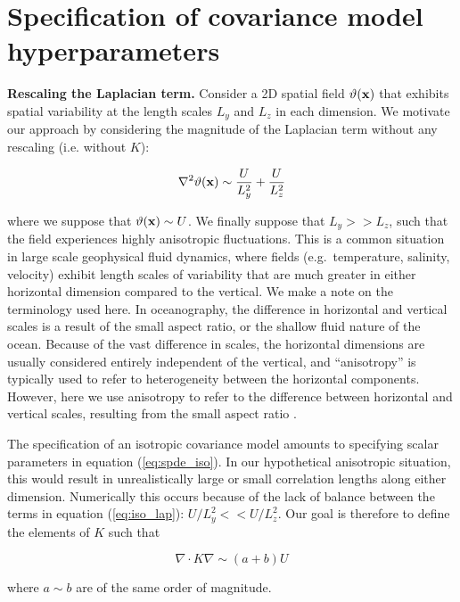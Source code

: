 \section{Specification of covariance model hyperparameters}
\label{sec:matern_operator}

\noindent\textbf{Rescaling the Laplacian term.}
Consider a 2D spatial field $\vartheta(\mathbf{x})$ that exhibits spatial variability at the
length scales $L_y$ and $L_z$ in each dimension.
We motivate our approach by considering the magnitude of
the Laplacian term without any rescaling (i.e. without $K$):
\begin{linenomath}\begin{equation}
    \nabla^2 \vartheta(\mathbf{x}) \sim \dfrac{U}{L_y^2} + \dfrac{U}{L_z^2}
    \label{eq:iso_lap}
\end{equation}\end{linenomath}
where we suppose that $\vartheta(\mathbf{x})\sim U$.
We finally suppose that $L_y >> L_z$, such that the field experiences highly
anisotropic fluctuations.
This is a common situation in large scale geophysical fluid
dynamics, where fields (e.g.\ temperature, salinity, velocity) exhibit length scales of
variability that are much greater in either horizontal dimension compared to the
vertical.
We make a note on the terminology used here.
In oceanography, the difference in horizontal and vertical scales
is a result of the small aspect ratio, or the shallow fluid nature of the ocean.
Because of the vast difference in scales, the horizontal dimensions are usually
considered entirely independent of the vertical, and ``anisotropy'' is typically
used to refer to heterogeneity between the horizontal components.
However, here we use anisotropy to refer to the difference between horizontal
and vertical scales, resulting from the small aspect ratio \citep{vallis2006}.

The specification of an isotropic covariance model amounts to specifying scalar
parameters in equation (\ref{eq:spde_iso}).
In our hypothetical anisotropic  situation, this would result in unrealistically large or
small correlation lengths along either dimension.
Numerically this occurs because of the lack of balance between the terms in
equation (\ref{eq:iso_lap}): $U/L_y^2 << U/L_z^2$.
Our goal is therefore to define the elements of $K$ such that
\begin{linenomath*}\begin{equation*}
    \nabla\cdot K\nabla \sim (a+b)U
\end{equation*}\end{linenomath*}
where $a \sim b$ are of the same order of magnitude.

